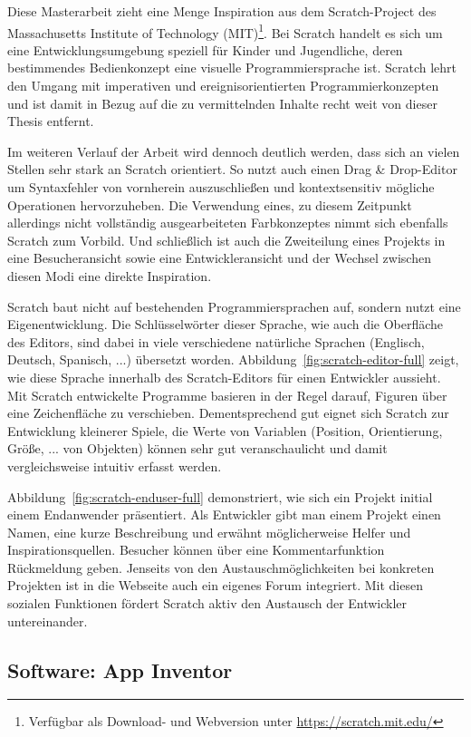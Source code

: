 Diese Masterarbeit zieht eine Menge Inspiration aus dem Scratch-Project des Massachusetts Institute of Technology (MIT)\footnote{Verfügbar als Download- und Webversion unter \url{https://scratch.mit.edu/}}. Bei Scratch handelt es sich um eine Entwicklungsumgebung speziell für Kinder und Jugendliche, deren bestimmendes Bedienkonzept eine visuelle Programmiersprache ist. Scratch lehrt den Umgang mit imperativen und ereignisorientierten Programmierkonzepten und ist damit in Bezug auf die zu vermittelnden Inhalte recht weit von dieser Thesis entfernt.

Im weiteren Verlauf der Arbeit wird dennoch deutlich werden, dass sich \idename{} an vielen Stellen sehr stark an Scratch orientiert. So nutzt auch \idename{} einen Drag \& Drop-Editor um Syntaxfehler von vornherein auszuschließen und kontextsensitiv mögliche Operationen hervorzuheben. Die Verwendung eines, zu diesem Zeitpunkt allerdings nicht vollständig ausgearbeiteten Farbkonzeptes nimmt sich ebenfalls Scratch zum Vorbild. Und schließlich ist auch die Zweiteilung eines Projekts in eine Besucheransicht sowie eine Entwickleransicht und der Wechsel zwischen diesen Modi eine direkte Inspiration.

Scratch baut nicht auf bestehenden Programmiersprachen auf, sondern nutzt eine Eigenentwicklung. Die Schlüsselwörter dieser Sprache, wie auch die Oberfläche des Editors, sind dabei in viele verschiedene natürliche Sprachen (Englisch, Deutsch, Spanisch, ...) übersetzt worden. Abbildung~\ref{fig:scratch-editor-full} zeigt, wie diese Sprache innerhalb des Scratch-Editors für einen Entwickler aussieht. Mit Scratch entwickelte Programme basieren in der Regel darauf, Figuren über eine Zeichenfläche zu verschieben. Dementsprechend gut eignet sich Scratch zur Entwicklung kleinerer Spiele, die Werte von Variablen (Position, Orientierung, Größe, ... von Objekten) können sehr gut veranschaulicht und damit vergleichsweise intuitiv erfasst werden.

Abbildung~\ref{fig:scratch-enduser-full} demonstriert, wie sich ein Projekt initial einem Endanwender präsentiert. Als Entwickler gibt man einem Projekt einen Namen, eine kurze Beschreibung und erwähnt möglicherweise Helfer und Inspirationsquellen. Besucher können über eine Kommentarfunktion Rückmeldung geben. Jenseits von den Austauschmöglichkeiten bei konkreten Projekten ist in die Webseite auch ein eigenes Forum integriert. Mit diesen sozialen Funktionen fördert Scratch aktiv den Austausch der Entwickler untereinander.

\subsection{Software: App Inventor}


